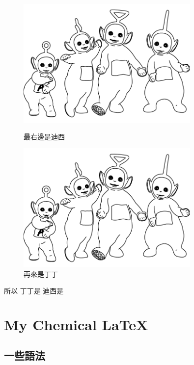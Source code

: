 \begin{figure}[H]%
    \centering %
    \begin{minipage}[b]{0.4\textwidth} %
      \centering %
      \includegraphics[width=0.8\textwidth]{a.png}
      \caption{最右邊是迪西}
      \label{fig:迪西}
    \end{minipage}
    \begin{minipage}[b]{0.4\textwidth} %
      \centering %
      \includegraphics[width=0.8\textwidth]{a.png}
      \caption{再來是丁丁}
      \label{fig:丁丁}
    \end{minipage}
  \end{figure}
  所以
  丁丁是
  迪西是




\section{My Chemical LaTeX}
  \subsection*{一些語法}
  
